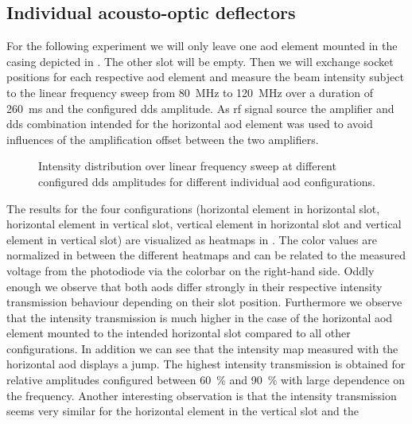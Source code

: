 \subsection{Individual acousto-optic deflectors}

For the following experiment we will only leave one \gls{aod} element mounted
in the casing depicted in . The other slot will be empty.
Then we will exchange socket positions for each respective \gls{aod} element
and measure the beam intensity subject to the linear frequency sweep from
\SI{80}{\mega\hertz} to \SI{120}{\mega\hertz} over a duration of
\SI{260}{\milli\second} and the configured \gls{dds} amplitude. As \gls{rf}
signal source the amplifier and \gls{dds} combination intended for the
horizontal \gls{aod} element was used to avoid influences of the amplification
offset between the two amplifiers.
\begin{figure}[htb]
  \centering
  \begin{adjustbox}{width=\textwidth}
  \end{adjustbox}
  \caption{Intensity distribution over linear frequency sweep at different
    configured \gls{dds} amplitudes for different individual \gls{aod}
    configurations.
  }\label{fig:intensity_distribution_unpaired}
\end{figure}
The results for the four configurations (horizontal element in horizontal
slot, horizontal element in vertical slot, vertical element in horizontal
slot and vertical element in vertical slot) are visualized as heatmaps in
. The color values are normalized in
between the different heatmaps and can be related to the measured voltage from
the photodiode via the colorbar on the right-hand side. Oddly enough we
observe that both \gls{aod}s differ strongly in their respective intensity
transmission behaviour depending on their slot position. Furthermore we
observe that the intensity transmission is much higher in the case of the
horizontal \gls{aod} element mounted to the intended horizontal slot compared
to all other configurations. In addition we can see that the intensity map
measured with the horizontal \gls{aod} displays a jump. The highest intensity
transmission is obtained for relative amplitudes configured between
\SI{60}{\percent} and \SI{90}{\percent} with large dependence on the
frequency. Another interesting observation is that the intensity transmission
seems very similar for the horizontal element in the vertical slot and the
